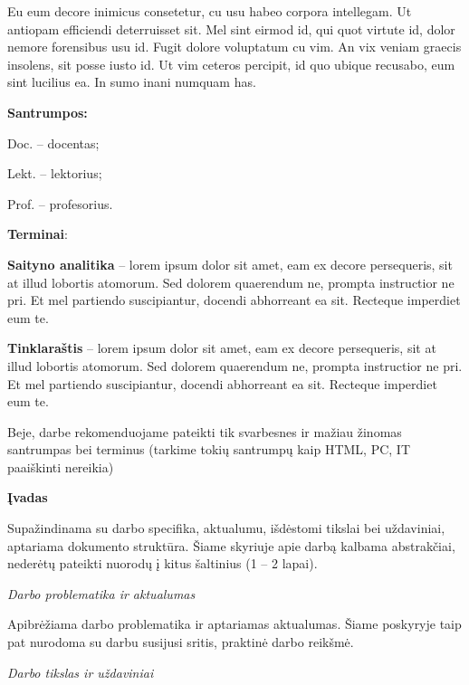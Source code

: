 \documentclass{ktuthesis}
\begin{document}
  Eu eum decore inimicus consetetur, cu usu habeo corpora intellegam. Ut antiopam efficiendi deterruisset sit. Mel sint eirmod id, qui quot virtute id, dolor nemore forensibus usu id. Fugit dolore voluptatum cu vim. An vix veniam graecis insolens, sit posse iusto id. Ut vim ceteros percipit, id quo ubique recusabo, eum sint lucilius ea. In sumo inani numquam has.
  \clearpage

  \tableofcontents
  \clearpage

  \listoftables
  \clearpage

  \listoffigures
  \clearpage


  \textbf{Santrumpos:}

  Doc. – docentas;

  Lekt. – lektorius;

  Prof. – profesorius.

  \textbf{Terminai}:

  \textbf{Saityno analitika} – lorem ipsum dolor sit amet, eam ex decore persequeris, sit at illud lobortis atomorum. Sed dolorem quaerendum ne, prompta instructior ne pri. Et mel partiendo suscipiantur, docendi abhorreant ea sit. Recteque imperdiet eum te.

  \textbf{Tinklaraštis} – lorem ipsum dolor sit amet, eam ex decore persequeris, sit at illud lobortis atomorum. Sed dolorem quaerendum ne, prompta instructior ne pri. Et mel partiendo suscipiantur, docendi abhorreant ea sit. Recteque imperdiet eum te.

  Beje, darbe rekomenduojame pateikti tik svarbesnes ir mažiau žinomas santrumpas bei terminus (tarkime tokių santrumpų kaip HTML, PC, IT paaiškinti nereikia)
  \clearpage

  \begin{center}
    \textbf{Įvadas}
  \end{center}

  Supažindinama su darbo specifika, aktualumu, išdėstomi tikslai bei uždaviniai, aptariama dokumento struktūra. Šiame skyriuje apie darbą kalbama abstrakčiai, nederėtų pateikti nuorodų į kitus šaltinius (1 – 2 lapai).

  \textit{Darbo problematika ir aktualumas}

  Apibrėžiama darbo problematika ir aptariamas aktualumas. Šiame poskyryje taip pat nurodoma su darbu susijusi sritis, praktinė darbo reikšmė.

  \textit{Darbo tikslas ir uždaviniai}
\end{document}

